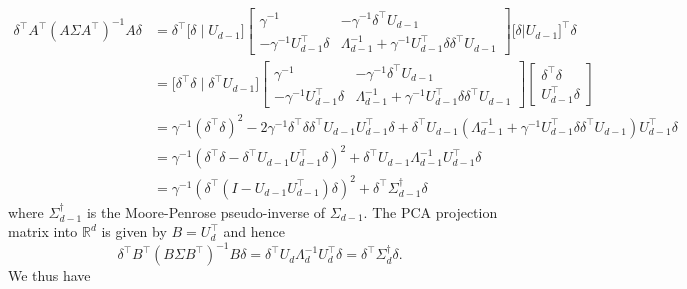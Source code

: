\documentclass[10pt]{article}
\begin{document}
 \begin{equation*}
 \begin{split}
 \delta^{\top} A^{\top} (A \Sigma A^{\top})^{-1} A \delta & = \delta^{\top} \bigl[ \delta \mid U_{d-1} \bigr] \begin{bmatrix} \gamma^{-1} & - \gamma^{-1} \delta^{\top} U_{d-1} \\ - \gamma^{-1} U_{d-1}^{\top} \delta & \Lambda_{d-1}^{-1} + \gamma^{-1}  U_{d-1}^{\top} \delta \delta^{\top} U_{d-1} \end{bmatrix} \bigl[ \delta | U_{d-1} \bigr]^{\top} \delta \\
 &= \bigl[\delta^{\top} \delta \mid \delta^{\top} U_{d-1} \bigr] \begin{bmatrix} \gamma^{-1} & - \gamma^{-1} \delta^{\top} U_{d-1} \\ - \gamma^{-1} U_{d-1}^{\top} \delta & \Lambda_{d-1}^{-1} + \gamma^{-1}  U_{d-1}^{\top} \delta \delta^{\top} U_{d-1} \end{bmatrix} \begin{bmatrix} \delta^{\top} \delta \\ U_{d-1}^{\top} \delta \end{bmatrix} \\
 &= \gamma^{-1} (\delta^{\top} \delta)^{2} - 2 \gamma^{-1} \delta^{\top} \delta \delta^{\top} U_{d-1} U_{d-1}^{\top} \delta + \delta^{\top} U_{d-1} (\Lambda_{d-1}^{-1} + \gamma^{-1} U_{d-1}^{\top} \delta \delta^{\top} U_{d-1}) U_{d-1}^{\top} \delta \\
 &= \gamma^{-1} (\delta^{\top} \delta - \delta^{\top} U_{d-1} U_{d-1}^{\top} \delta)^{2} + \delta^{\top} U_{d-1} \Lambda_{d-1}^{-1} U_{d-1}^{\top} \delta \\
 &= \gamma^{-1} (\delta^{\top} (I - U_{d-1} U_{d-1}^{\top}) \delta)^{2} + \delta^{\top} \Sigma_{d-1}^{\dagger} \delta
 \end{split}
 \end{equation*}
 where $\Sigma_{d-1}^{\dagger}$ is the Moore-Penrose pseudo-inverse of $\Sigma_{d-1}$. The PCA projection matrix into $\mathbb{R}^{d}$ is given by $B = U_{d}^{\top}$ and hence
 \begin{equation}
 \delta^{\top} B^{\top} (B \Sigma B^{\top})^{-1} B \delta = \delta^{\top} U_{d} \Lambda_d^{-1} U_d^{\top} \delta = \delta^{\top} \Sigma_{d}^{\dagger} \delta.
 \end{equation}
 We thus have
\end{document}
